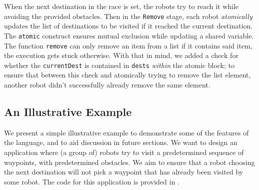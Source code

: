  When the next destination in the race is set, the robots try to reach it while avoiding the provided obstacles. Then in the \verb|Remove| stage, each robot \emph{atomically} updates the list of destinations to be visited if it reached the current destination. The \verb|atomic| construct ensures mutual exclusion while updating a shared variable. The function \verb|remove| can only remove an item from a list if it contains said item, the execution gets stuck otherwise. With that in mind, we added a check for whether the \verb|currentDest| is contained in \verb|dests| \emph{within} the atomic block; to ensure that between this check and atomically trying to remove the list element, another robot didn't successfully already remove the same element. \subsection[h]{An Illustrative Example}
\label{sect:Eg}
We present a simple illustrative example to demonstrate some of the features of the language, and to aid discussion in future sections. We want to design an application where (a group of) robots try to visit a predetermined sequence of waypoints, with predetermined obstacles. We aim to ensure that a robot choosing the next destination will not pick a waypoint that has already been visited by some robot. The code for this application is provided in .

